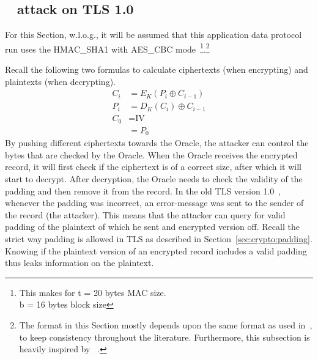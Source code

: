 \documentclass[10pt,conference,a4paper]{IEEEtran}
\begin{document}
\subsection{~\citeauthor{vaudenay2002security} attack on TLS 1.0}
\label{sec:paddingoracle:padding}
For this Section, w.l.o.g., it will be assumed that this application data protocol run uses the HMAC\_SHA1 with AES\_CBC mode~\footnote{This makes for t = 20 bytes MAC size. \\ b = 16 bytes block size}.\footnote{The format in this Section mostly depends upon the same format as used in~\cite{alfardan2013lucky}, to keep consistency throughout the literature. Furthermore, this subsection is heavily inspired by ~\cite{alfardan2013lucky,vaudenay2002security}.}

Recall the following two formulas to calculate ciphertexts (when  encrypting) and plaintexts (when decrypting).
\[
\begin{split}
C_i &= E_K(P_i \oplus C_{i-1}) \\
P_i &= D_K(C_i) \oplus C_{i-1} \\
C_0 &= \text{IV} \\
&= P_0
\end{split}
\]
By pushing different ciphertexts towards the Oracle, the attacker can control the bytes that are checked by the Oracle. When the Oracle receives the encrypted record, it will first check if the ciphertext is of a correct size, after which it will start to decrypt. After decryption, the Oracle needs to check the validity of the padding and then remove it from the record. In the old TLS version 1.0~\cite{dierks1999rfc}, whenever the padding was incorrect, an error-message was sent to the sender of the record (the attacker). This means that the attacker can query for valid padding of the plaintext of which he sent and encrypted version off. Recall the strict way padding is allowed in TLS as described in Section~\ref{sec:crypto:padding}. Knowing if the plaintext version of an encrypted record includes a valid padding thus leaks information on the plaintext.
\end{document}
